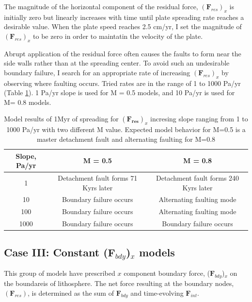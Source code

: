 \documentclass[letterpaper,12pt,notitle]{memphisthesis}                     %
\begin{document}
The magnitude of the horizontal component of the residual force, $(\boldsymbol{F}_{res})_{x}$ is initially zero but linearly increases with time until plate spreading rate reaches a desirable value. When the plate speed reaches 2.5 cm/yr, I set the magnitude of $(\boldsymbol{F}_{res})_{x}$ to be zero in order to maintatin the velocity of the plate.

Abrupt application of the residual force often causes the faults to form near the side walls rather than at the spreading center.
To avoid such an undesirable boundary failure, I search for an appropriate rate of increasing $(\boldsymbol{F}_{res})_{x}$ by observing where faulting occurs. Tried rates are in the range of 1 to 1000 Pa/yr (Table \ref{tab:slope}). 1 Pa/yr slope is used for M = 0.5 models, and 10 Pa/yr is used for M= 0.8 models. 
%
\begin{table}[h!]
	\centering
	\caption{Model results of 1Myr of spreading for $(\boldsymbol{F_{res}})_x$ incresing slope ranging from 1 to 1000 Pa/yr with two different M value. Expected model behavior for M=0.5 is a master detachment fault and alternating faulting for M=0.8}
	\label{tab:slope}
	\begin{tabular}{ccc}
		\toprule
		Slope, Pa/yr & M = 0.5 & M = 0.8\\
		\midrule
          	1 & Detachment fault forms 71 Kyrs later & Detachment fault forms 240 Kyrs later\\
		10 & Boundary failure occurs & Alternating faulting mode \\
		100 & Boundary failure occurs & Alternating faulting mode \\
		1000 & Boundary failure occurs & Boundary failure occurs\\
		\bottomrule
	\end{tabular}
\end{table}
%

\subsection{Case III: Constant ($\boldsymbol{F}_{bdy}$)$_x$ models}

This group of models have prescribed $x$ component boundary force, ($\boldsymbol{F}_{bdy}$)$_x$ on the boundareis of lithosphere. The net force resulting at the boundary nodes, $(\boldsymbol{F}_{res})$, is determined as the sum of $\boldsymbol{F}_{bdy}$ and time-evolving $\boldsymbol{F}_{int}$.
\end{document}
